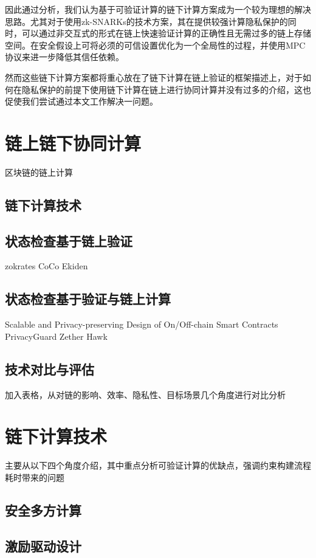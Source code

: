 因此通过分析，我们认为基于可验证计算的链下计算方案成为一个较为理想的解决思路。尤其对于使用zk-SNARKs的技术方案，其在提供较强计算隐私保护的同时，可以通过非交互式的形式在链上快速验证计算的正确性且无需过多的链上存储空间。在安全假设上可将必须的可信设置优化为一个全局性的过程，并使用MPC协议来进一步降低其信任依赖。

然而这些链下计算方案都将重心放在了链下计算在链上验证的框架描述上，对于如何在隐私保护的前提下使用链下计算在链上进行协同计算并没有过多的介绍，这也促使我们尝试通过本文工作解决一问题。

\section{链上链下协同计算}
区块链的链上计算

\subsection{链下计算技术}

\subsection{状态检查基于链上验证}

zokrates
CoCo
Ekiden

\subsection{状态检查基于验证与链上计算}

Scalable and Privacy-preserving Design of
On/Off-chain Smart Contracts
PrivacyGuard
Zether
Hawk

\subsection{技术对比与评估}

加入表格，从对链的影响、效率、隐私性、目标场景几个角度进行对比分析

\section{链下计算技术}
主要从以下四个角度介绍，其中重点分析可验证计算的优缺点，强调约束构建流程耗时带来的问题

\subsection{安全多方计算}

\subsection{激励驱动设计}

